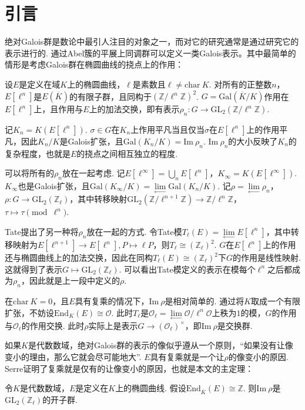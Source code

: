 \section{引言}

绝对Galois群是数论中最引人注目的对象之一，而对它的研究通常是通过研究它的表示进行的.
通过Abel簇的平展上同调群可以定义一类Galois表示。其中最简单的情形是考虑Galois群在椭圆曲线的挠点上的作用：

设$E$是定义在域$K$上的椭圆曲线，$\ell$是素数且$\ell\neq \mathrm{char}\ K$. 对所有的正整数$n$，$E[\ell^n]$是$E(\overline{K})$的有限子群，且同构于$(\mathbb{Z}/\ell^n\mathbb{Z})^2$. $G = \mathrm{Gal}(\overline{K}/K)$作用在$E[\ell^n]$上，且作用与$E$上的加法交换，即有表示$\rho_n:G\to \mathrm{GL}_2(\mathbb{Z}/\ell^n \mathbb{Z})$.

记$K_n=K(E[\ell^n])$. $\sigma\in G$在$K_n$上作用平凡当且仅当$\sigma$在$E[\ell^n]$上的作用平凡，因此$K_n/K$是Galois扩张，且$\mathrm{Gal}(K_n/K)=\mathrm{Im}\ \rho_n$. $\mathrm{Im}\ \rho_n$的大小反映了$K_n$的复杂程度，也就是$E$的挠点之间相互独立的程度.

可以将所有的$\rho_n$放在一起考虑. 记$E[\ell^{\infty}]=\bigcup_n E[\ell^n]$，$K_{\infty} = K(E[\ell^{\infty}])$. $K_{\infty}$也是Galois扩张，且$\mathrm{Gal}(K_{\infty}/K) = \lim\limits_{\longleftarrow} \mathrm{Gal}(K_n/K)$. 记$\rho = \lim\limits_{\longleftarrow} \rho_n$，$\rho: G\to \mathrm{GL}_2(\mathbb{Z}_{\ell})$，其中转移映射$\mathrm{GL}_2(\mathbb{Z}/\ell^{n+1} \mathbb{Z}) \to \mathbb{Z}/\ell^n \mathbb{Z}$，$\tau \mapsto \tau \pmod{\ell^n}$.

Tate提出了另一种将$\rho_n$放在一起的方式. 令Tate模$T_{\ell}(E) = \lim\limits_{\longleftarrow} E[\ell^n]$，其中转移映射为$E[\ell^{n+1}]\to E[\ell^n], P\mapsto \ell P$，则$T_{\ell}\cong (\mathbb{Z}_{\ell})^2$. $G$在$E[\ell^n]$上的作用还与椭圆曲线上的加法交换，因此在同构$T_{\ell}(E)\cong (\mathbb{Z}_{\ell})^2$下$G$的作用是线性映射. 这就得到了表示$G\mapsto \mathrm{GL}_2(\mathbb{Z}_{\ell})$. 可以看出Tate模定义的表示在模每个$\ell^n$之后都成为$\rho_n$，因此就是上一段中定义的$\rho$.

在$\mathrm{char}\ K = 0$，且$E$具有复乘的情况下，$\mathrm{Im}\ \rho$是相对简单的. 通过将$K$取成一个有限扩张，不妨设$\mathrm{End}_K(E) \cong \mathcal{O}$. 此时$T_{\ell}$是$\mathcal{O}_{\ell} = \lim\limits_{\longleftarrow}\mathcal{O}/\ell^n \mathcal{O}$上秩为$1$的模，$G$的作用与$\mathcal{O}_{\ell}$的作用交换. 此时$\rho$实际上是表示$G\to (\mathcal{O}_{\ell})^{\times}$，即$\mathrm{Im}\ \rho$是交换群.

如果$K$是代数数域，绝对Galois群的表示的像似乎遵从一个原则，“如果没有让像变小的理由，那么它就会尽可能地大”. $E$具有复乘就是一个让$\rho$的像变小的原因. Serre证明了复乘就是仅有的让像变小的原因，也就是本文的主定理：

\begin{cthm}
    令$K$是代数数域，$E$是定义在$K$上的椭圆曲线. 假设$\mathrm{End}_{\overline{K}}(E) \cong \mathbb{Z}$. 则$\mathrm{Im}\ \rho$是$\mathrm{GL}_2(\mathbb{Z}_{\ell})$的开子群.
\end{cthm}

